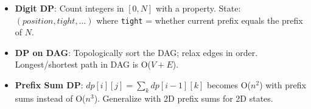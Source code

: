 \begin{itemize}
    \item \textbf{Digit DP}: Count integers in $[0, N]$ with a property. State: $(position, tight, \ldots)$ where \texttt{tight} = whether current prefix equals the prefix of $N$.

    \item \textbf{DP on DAG}: Topologically sort the DAG; relax edges in order. Longest/shortest path in DAG is O($V + E$).

    \item \textbf{Prefix Sum DP}: $dp[i][j] = \sum_{k} dp[i-1][k]$ becomes O($n^2$) with prefix sums instead of O($n^3$). Generalize with 2D prefix sums for 2D states.
\end{itemize}